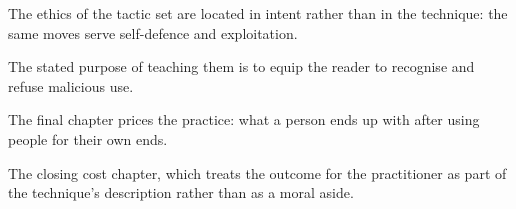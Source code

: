 

\begin{distilled}
  \item The ethics of the tactic set are located in intent rather than in the technique: the same moves serve self-defence and exploitation.
  \item The stated purpose of teaching them is to equip the reader to recognise and refuse malicious use.
  \item The final chapter prices the practice: what a person ends up with after using people for their own ends.
\end{distilled}

\begin{unique}
  \item The closing cost chapter, which treats the outcome for the practitioner as part of the technique's description rather than as a moral aside.
\end{unique}
